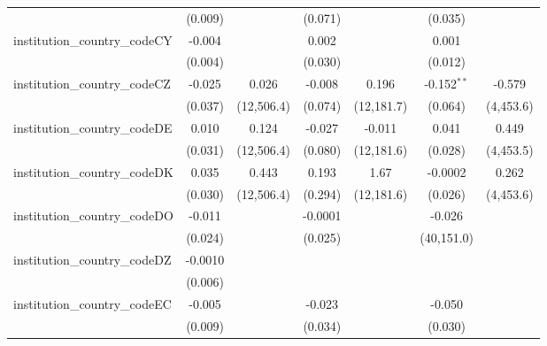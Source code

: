 \begin{tabular}{lcccccc}
                                         & (0.009)        &               & (0.071)       &               & (0.035)       &   \\   
   institution\_country\_codeCY          & -0.004         &               & 0.002         &               & 0.001         &   \\   
                                         & (0.004)        &               & (0.030)       &               & (0.012)       &   \\   
   institution\_country\_codeCZ          & -0.025         & 0.026         & -0.008        & 0.196         & -0.152$^{**}$ & -0.579\\   
                                         & (0.037)        & (12,506.4)    & (0.074)       & (12,181.7)    & (0.064)       & (4,453.6)\\   
   institution\_country\_codeDE          & 0.010          & 0.124         & -0.027        & -0.011        & 0.041         & 0.449\\   
                                         & (0.031)        & (12,506.4)    & (0.080)       & (12,181.6)    & (0.028)       & (4,453.5)\\   
   institution\_country\_codeDK          & 0.035          & 0.443         & 0.193         & 1.67          & -0.0002       & 0.262\\   
                                         & (0.030)        & (12,506.4)    & (0.294)       & (12,181.6)    & (0.026)       & (4,453.6)\\   
   institution\_country\_codeDO          & -0.011         &               & -0.0001       &               & -0.026        &   \\   
                                         & (0.024)        &               & (0.025)       &               & (40,151.0)    &   \\   
   institution\_country\_codeDZ          & -0.0010        &               &               &               &               &   \\   
                                         & (0.006)        &               &               &               &               &   \\   
   institution\_country\_codeEC          & -0.005         &               & -0.023        &               & -0.050        &   \\   
                                         & (0.009)        &               & (0.034)       &               & (0.030)       &   \\   

\end{tabular}
